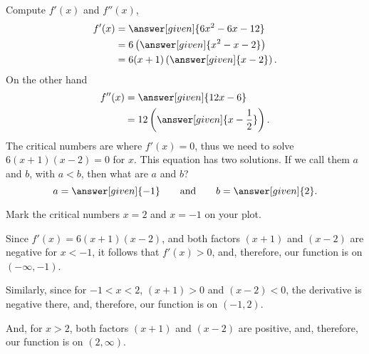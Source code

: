 \documentclass[wordchoicegiven]{ximera}
\begin{document}
\begin{example}
Compute $f'(x)$ and $f''(x)$,
\begin{align*}
  f'(x) &= \answer[given]{6x^2 -6x -12}\\
  &=6\left(\answer[given]{x^2-x-2}\right)\\
  &=6(x+1)\left(\answer[given]{x-2}\right).
\end{align*}
On the other hand
\begin{align*}
  f''(x) &= \answer[given]{12x-6}\\
  &=12\left(\answer[given]{x-\frac{1}{2}}\right).
\end{align*}
The critical numbers are where $f'(x) = 0$, thus we need to solve
$6(x+1)(x-2) = 0$ for $x$.  This equation has two solutions.  If we
call them $a$ and $b$, with $a<b$, then what are $a$ and $b$?
\[
a = \answer[given]{-1}\qquad\text{and}\qquad b = \answer[given]{2}.
\]

Mark the critical numbers $x=2$ and $x=-1$ on your plot. %
\begin{image}
\end{image}
Since $f'(x)=6(x+1)(x-2)$, and both factors $(x+1)$ and $(x-2)$ are
negative for $x<-1$, it follows that $f'(x)>0$, and, therefore, our
function is  on $(-\infty,-1)$.


Similarly, since for $-1<x<2$, $(x+1)>0$ and $(x-2)<0$, the
derivative is negative there, and, therefore, our function is
 on
$(-1,2)$.



And, for $x>2$, both factors $(x+1)$ and $(x-2)$ are positive, and,
therefore, our function is  on $(2,\infty)$.
  

\end{example}
\end{document}
